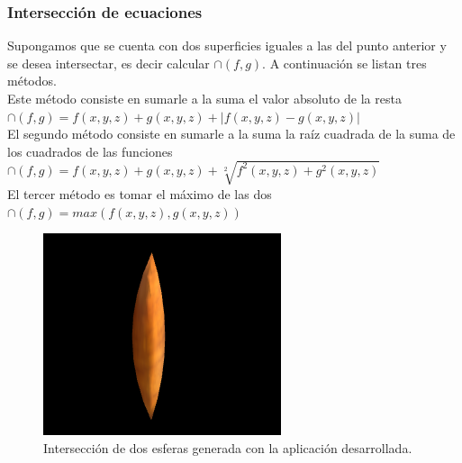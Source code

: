 \documentclass[12pt]{article}
\begin{document}
\subsubsection{Intersección de ecuaciones}
Supongamos que se cuenta con dos superficies iguales a las del punto anterior y se desea intersectar, es decir calcular $\cap(f,g)$. A continuación se listan tres métodos.
\\Este método consiste en sumarle a la suma el valor absoluto de la resta  $\cap(f,g)= f(x,y,z) + g(x,y,z)+ |f(x,y,z) - g(x,y,z)|$ 
\\El segundo método consiste en sumarle a la suma la raíz cuadrada de la suma de los cuadrados de las funciones   $\cap(f,g)= f(x,y,z) + g(x,y,z)+ \sqrt[2]{f^2(x,y,z) +g^2(x,y,z)}$ 
\\El tercer método es tomar el máximo de las dos   $\cap(f,g)= max(f(x,y,z) , g(x,y,z))$
\begin{figure}[h]
\includegraphics[width=0.7\linewidth,center]{oi2.png}
\caption{Intersección de dos esferas generada con la aplicación desarrollada.}
\end{figure}
\end{document}

